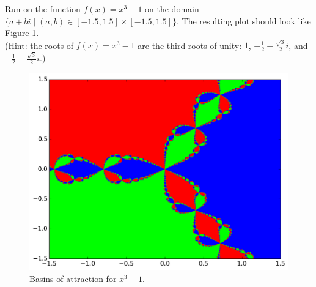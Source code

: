 \begin{problem}

Run  on the function $f(x) = x^3-1$ on the domain $\{a+bi \mid (a, b) \in [-1.5, 1.5] \times [-1.5, 1.5] \}$.
The resulting plot should look like Figure \ref{fig:fractal_hw}.
\\ (Hint: the roots of $f(x) = x^3-1$ are the third roots of unity: $1$, $-\frac{1}{2} + \frac{\sqrt{3}}{2}i$, and $-\frac{1}{2} - \frac{\sqrt{3}}{2}i$.)

\begin{figure}[H]
    \centering
    \includegraphics[scale=0.66]{figures/fractal_hw.pdf}
    \caption{Basins of attraction for $x^3-1$.}
    \label{fig:fractal_hw}
\end{figure}
\end{problem}

